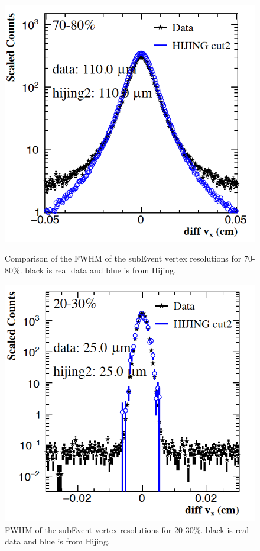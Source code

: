 \begin{figure}[htbp]
\begin{minipage}[htbp]{0.47\linewidth}
\centering
\includegraphics[width=1.0\textwidth,angle=0]{figure/Run14_D0HFT/vxtX_70_80.png}
\caption{ Comparison of the FWHM of the subEvent vertex resolutions for 70-80\%. black is real data and blue is from Hijing. \label{vtxX_70_80}}
\end{minipage}
\hfill
\begin{minipage}[htbp]{0.47\linewidth}
\centering
\includegraphics[width=1.0\textwidth,angle=0]{figure/Run14_D0HFT/vtxX_20_30.png} 
\caption{ FWHM of the subEvent vertex resolutions for 20-30\%. black is real data and blue is from Hijing.\label{vtxX_20_30}}
\end{minipage}
\end{figure}

